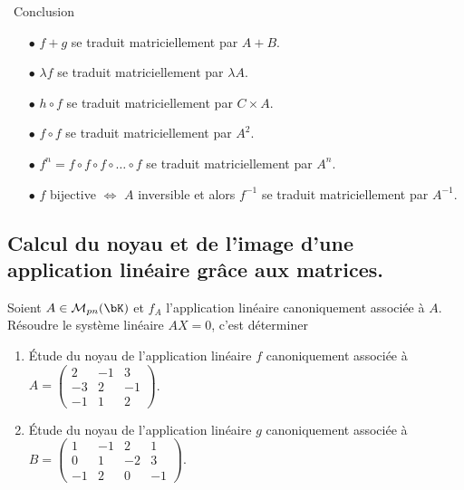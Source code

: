\documentclass[a4paper, 11pt]{article}
\begin{document}
\noindent\ {Conclusion}\\
\begin{dboxminipage}{0.8\textwidth}
\begin{itemize}
\item[$\bullet$] $f+g$ se traduit matriciellement par $A+B$.
\item[$\bullet$] $\lambda f$ se traduit matriciellement par $\lambda A$.
\item[$\bullet$] $h\circ f$ se traduit matriciellement par $C\times A$.
\item[$\bullet$] $f\circ f$ se traduit matriciellement par $A^2$.
\item[$\bullet$] $f^n=f\circ f\circ f\circ \dots\circ f$ se traduit matriciellement par $A^n$.
\item[$\bullet$] $f$ bijective $\Leftrightarrow$ $A$ inversible et alors $f^{-1}$ se traduit matriciellement par $A^{-1}$.
\end{itemize}
\end{dboxminipage}





\subsection{Calcul du noyau et de l'image d'une application lin\'eaire gr\^ace aux matrices.} %

\vspace{0.4cm}


\begin{prop}
Soient $A\in\mathcal{M}_{pn}(\bK)$ et $f_A$ l'application lin\'eaire canoniquement associ\'ee \`a $A$.\vsec\\
\noindent R\'esoudre le syst\`eme lin\'eaire $AX=0$, c'est d\'eterminer \dotfill\vsec
\end{prop}
 \vsec


{\footnotesize \begin{exercice}
\begin{enumerate}
\item \'Etude du noyau de l'application lin\'eaire $f$ canoniquement associ\'ee \`a $A=\left( \begin{array}{rrr} 2&-1&3\\-3&2&-1\\-1&1&2   \end{array}\right)$.
\item \'Etude du noyau de l'application lin\'eaire $g$ canoniquement associ\'ee \`a $B=\left( \begin{array}{rrrr} 1&-1&2&1\\0&1&-2&3\\-1&2&0&-1   \end{array}\right)$.
\end{enumerate}
\end{exercice}
}
\end{document}
